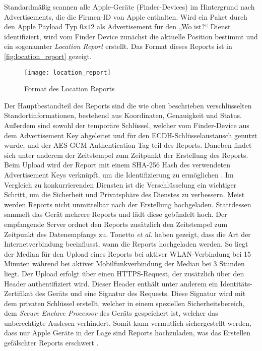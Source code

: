 Standardmäßig scannen alle Apple-Geräte (Finder-Devices) im Hintergrund nach Advertisements, die die Firmen-ID von Apple enthalten.
Wird ein Paket durch den Apple Payload Typ $0x12$ als Advertisement für den „Wo ist?“ Dienst identifiziert, wird vom Finder Device zunächst die aktuelle Position bestimmt und ein sogenannter \textit{Location Report} erstellt.
Das Format dieses Reports ist in \autoref{fig:location_report} gezeigt.
\begin{figure}
    \centering
    \texttt{[image: location\_report]}
    \caption{Format des Location Reports \cite{Heinrich_FindMy}}
    \label{fig:location_report}
\end{figure}
Der Hauptbestandteil des Reports sind die wie oben beschrieben verschlüsselten Standortinformationen, bestehend aus Koordinaten, Genauigkeit und Status.
Außerdem sind sowohl der temporäre Schlüssel, welcher vom Finder-Device aus dem Advertisement Key abgeleitet und für den \ac{ECDH}-Schlüsselaustausch genutzt wurde, und der \ac{AES}-\ac{GCM} Authentication Tag teil des Reports.
Daneben findet sich unter anderem der Zeitstempel zum Zeitpunkt der Erstellung des Reports.
Beim Upload wird der Report mit einem \ac{SHA}-256 Hash des verwendeten Advertisement Keys verknüpft, um die Identifizierung zu ermöglichen \cite{Heinrich_FindMy}.
Im Vergleich zu konkurrierenden Diensten ist die Verschlüsselung ein wichtiger Schritt, um die Sicherheit und Privatsphäre des Dienstes zu verbessern.
Meist werden Reports nicht unmittelbar nach der Erstellung hochgeladen.
Stattdessen sammelt das Gerät mehrere Reports und lädt diese gebündelt hoch.
Der empfangende Server ordnet den Reports zusätzlich den Zeitstempel zum Zeitpunkt des Datenempfangs zu.
Tonetto \textit{et al.} \cite{Tonetto_FindMy} haben gezeigt, dass die Art der Internetverbindung beeinflusst, wann die Reports hochgeladen werden.
So liegt der Median für den Upload eines Reports bei aktiver WLAN-Verbindung bei 15 Minuten während bei aktiver Mobilfunkverbindung der Median bei 3 Stunden liegt.
Der Upload erfolgt über einen HTTPS-Request, der zusätzlich über den Header authentifiziert wird.
Dieser Header enthält unter anderem ein Identitäts-Zertifikat des Geräts und eine Signatur des Requests.
Diese Signatur wird mit dem privaten Schlüssel erstellt, welcher in einem speziellen Sicherheitsbereich, dem \textit{Secure Enclave Processor} des Geräts gespeichert ist, welcher das unberechtigte Auslesen verhindert.
Somit kann vermutlich sichergestellt werden, dass nur Apple Geräte in der Lage sind Reports hochzuladen, was das Erstellen gefälschter Reports erschwert \cite{Heinrich_FindMy}.


